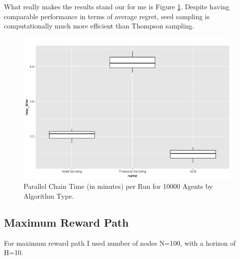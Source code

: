 \documentclass{article}
\begin{document}
What really makes the results stand our for me is Figure \ref{fig:pc_max_time_per_ag_by_algo}.  Despite having comparable performance in terms of average regret, seed sampling is computationally much more efficient than Thompson sampling. 
\begin{figure}[htbp!]
  \centering
\includegraphics[scale=.3]{pc_max_time_per_ag_by_algo.jpg}

  \caption{Parallel Chain Time (in minutes) per Run for 10000 Agents by Algorithm Type.}
 \label{fig:pc_max_time_per_ag_by_algo}
\end{figure}


\subsection{Maximum Reward Path}
For maximum reward path I used number of nodes N=100,  with a horizon of H=10.
\end{document}

